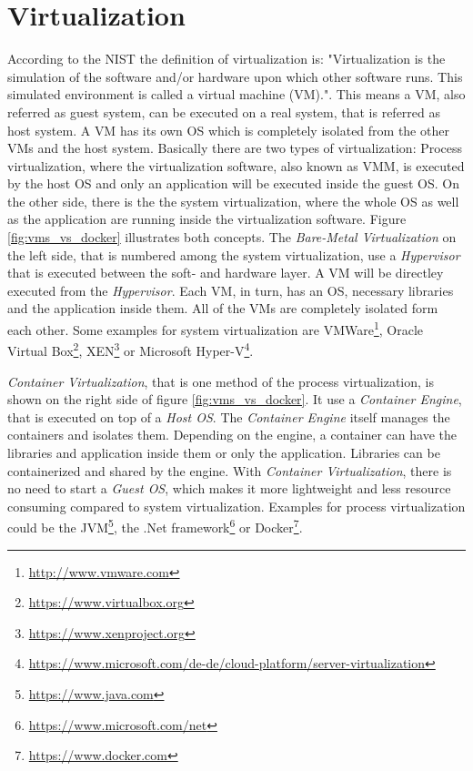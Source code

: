 \section{Virtualization}
\label{section:state_virtualization}
According to the \ac{NIST} the definition of virtualization is: "Virtualization is the simulation of the software and/or hardware upon which other software runs. This simulated environment is called a virtual machine (VM)."\autocite[p. ES-1]{Sca:2011}.
This means a \ac{VM}, also referred as guest system, can be executed on a real system, that is referred as host system.
A \ac{VM} has its own \ac{OS} which is completely isolated from the other \acp{VM} and the host system.\autocite[cf.][p. 2]{Celesti:2016}
Basically there are two types of virtualization: Process virtualization, where the virtualization software, also known as \ac{VMM}, is executed by the host \ac{OS} and only an application will be executed inside the guest \ac{OS}.
On the other side, there is the the system virtualization, where the whole \ac{OS} as well as the application are running inside the virtualization software.
Figure \ref{fig:vms_vs_docker} illustrates both concepts.
The \textit{Bare-Metal Virtualization} on the left side, that is numbered among the system virtualization, use a \textit{Hypervisor} that is executed between the soft- and hardware layer.\autocite[cf.][p. 1771]{Manik:2016}
A \ac{VM} will be directley executed from the \textit{Hypervisor}.
Each \ac{VM}, in turn, has an \ac{OS}, necessary libraries and the application inside them.
All of the \acp{VM} are completely isolated form each other.\autocite[cf.][p.275]{Soltesz:2007}
Some examples for system virtualization are VMWare\footnote{\url{http://www.vmware.com}}, Oracle Virtual Box\footnote{\url{https://www.virtualbox.org}}, XEN\footnote{\url{https://www.xenproject.org}} or Microsoft Hyper-V\footnote{\url{https://www.microsoft.com/de-de/cloud-platform/server-virtualization}}.

\textit{Container Virtualization}, that is one method of the process virtualization, is shown on the right side of figure \ref{fig:vms_vs_docker}.
It use a \textit{Container Engine}, that is executed on top of a \textit{Host \ac{OS}}.
The \textit{Container Engine} itself manages the containers and isolates them.\autocite[cf.][p. 1]{Celesti:2016}
Depending on the engine, a container can have the libraries and application inside them or only the application.
Libraries can be containerized and shared by the engine.
With \textit{Container Virtualization}, there is no need to start a \textit{Guest \ac{OS}}, which makes it more lightweight and less resource consuming compared to system virtualization.\autocite[cf.][p. 2 ff.]{Celesti:2016}\autocite[cf.][p. 1]{Raho:2015}
Examples for process virtualization could be the \ac{JVM}\footnote{\url{https://www.java.com}}, the .Net framework\footnote{\url{https://www.microsoft.com/net}} or Docker\footnote{\url{https://www.docker.com}}.

